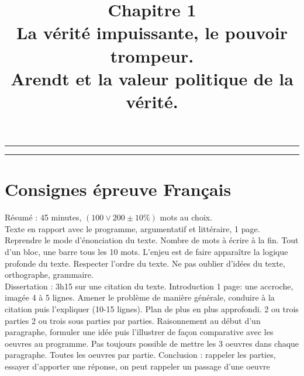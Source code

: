 \documentclass[12pt]{article}
\title{Chapitre 1\\\large La vérité impuissante, le pouvoir trompeur.\\Arendt et la valeur politique de la vérité.}
\date{}
\author{}
\begin{document}
\maketitle
\thispagestyle{fancy}
\hrule
\tableofcontents
\hrule
{}
\section*{Consignes épreuve Français}
Résumé : 45 minutes, $(100 \vee 200 \pm10\%)$ mots au choix.\\
Texte en rapport avec le programme, argumentatif et littéraire, 1 page. Reprendre le mode d'énonciation du texte. Nombre de mots à écrire à la fin. Tout d'un bloc, une barre tous les 10 mots. L'enjeu est de faire apparaître la logique profonde du texte. Respecter l'ordre du texte. 
Ne pas oublier d'idées du texte, orthographe, grammaire.\\
Dissertation : 3h15 sur une citation du texte. Introduction 1 page: une accroche, imagée 4 à 5 lignes. Amener le problème de manière générale, conduire à la citation puis l'expliquer (10-15 lignes). Plan de plus en plus approfondi.
2 ou trois parties 2 ou trois sous parties par parties. Raisonnement au début d'un paragraphe, formuler une idée puis l'illustrer de façon comparative avec les oeuvres au programme. Pas toujours possible de mettre les 3 oeuvres dans chaque paragraphe. Toutes les oeuvres par partie.
Conclusion : rappeler les parties, essayer d'apporter une réponse, on peut rappeler un passage d'une oeuvre 
\pagebreak
\end{document}
